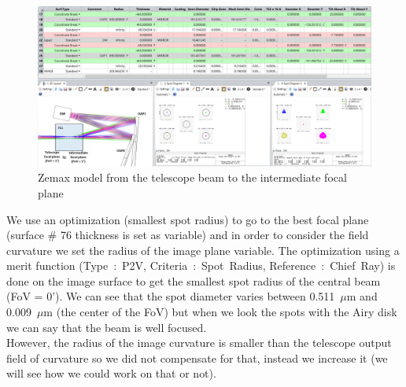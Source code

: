 \documentclass[12pt,a4paper]{article}
\begin{document}
\begin{figure}[H]
	\begin{center}
		\includegraphics[width=\textwidth]{images/Zemax_model_FP_OAP1.PNG}
		\caption{Zemax model from the telescope beam to the intermediate focal plane}\label{fig:Zemax_model_FP_OAP1}
	\end{center}
\end{figure}
We use an optimization (smallest spot radius) to go to the best focal plane (surface \# 76 thickness is set as variable) and in order to consider the field curvature we set the radius of the image plane variable. The optimization using a merit function (Type~:~P2V, Criteria~:~Spot~Radius, Reference~:~Chief~Ray) is done on the image surface to get the smallest spot radius of the central beam (FoV = 0'). We can see that the spot diameter varies between 0.511~$\mu$m and 0.009~$\mu$m (the center of the FoV) but when we look the spots with the Airy disk we can say that the beam is well focused.\\
However, the radius of the image curvature is smaller than the telescope output field of curvature so we did not compensate for that, instead we increase it (we will see how we could work on that or not).\\
\end{document}
